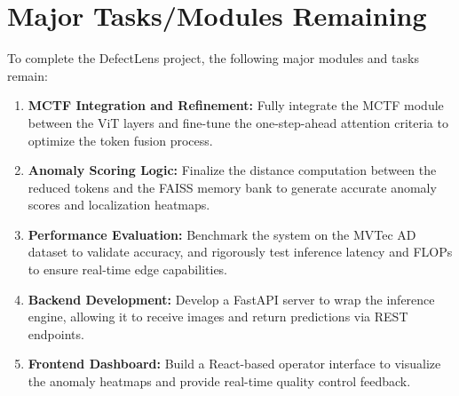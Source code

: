 \documentclass[12pt]{article}
\begin{document}
\section{Major Tasks/Modules Remaining}
To complete the DefectLens project, the following major modules and tasks remain:
\begin{enumerate}
    \item \textbf{MCTF Integration and Refinement:} Fully integrate the MCTF module between the ViT layers and fine-tune the one-step-ahead attention criteria to optimize the token fusion process.
    \item \textbf{Anomaly Scoring Logic:} Finalize the distance computation between the reduced tokens and the FAISS memory bank to generate accurate anomaly scores and localization heatmaps.
    \item \textbf{Performance Evaluation:} Benchmark the system on the MVTec AD dataset to validate accuracy, and rigorously test inference latency and FLOPs to ensure real-time edge capabilities.
    \item \textbf{Backend Development:} Develop a FastAPI server to wrap the inference engine, allowing it to receive images and return predictions via REST endpoints.
    \item \textbf{Frontend Dashboard:} Build a React-based operator interface to visualize the anomaly heatmaps and provide real-time quality control feedback.
\end{enumerate}
\end{document}
